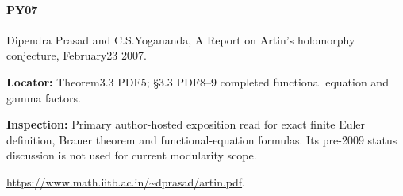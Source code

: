 \documentclass[11pt,a4paper]{article}
\begin{document}
\paragraph{PY07} Dipendra Prasad and C.\allowbreak{}S.\allowbreak{}Yogananda, A Report on Artin’s holomorphy conjecture, February23 2007.

\textbf{Locator:} Theorem3.\allowbreak{}3 PDF5; §3.\allowbreak{}3 PDF8–\allowbreak{}9 completed functional equation and gamma factors.

\textbf{Inspection:} Primary author-hosted exposition read for exact finite Euler definition, Brauer theorem and functional-equation formulas.\allowbreak{} Its pre-2009 status discussion is not used for current modularity scope.\allowbreak{}

\url{https://www.math.iitb.ac.in/~dprasad/artin.pdf}.
\end{document}

